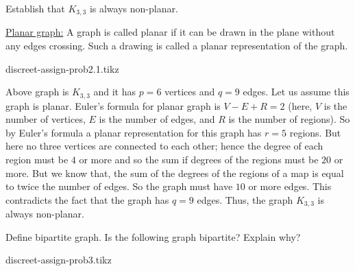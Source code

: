 \documentclass[12pt,class=article,crop=false]{standalone}
\begin{document}
\newpage
\begin{prob*}
    Establish that $ K_{3,3} $ is always non-planar.
\end{prob*}
\begin{soln}
    \underline{Planar graph:} A graph is called planar if it can be drawn in the plane without any edges crossing. Such a drawing is called a planar representation of the graph.\\

    \begin{center}
        {discreet-assign-prob2.1.tikz}
    \end{center}
    Above graph is $ K_{3,3} $ and it has $ p=6 $ vertices and $ q=9 $ edges. Let us assume this graph is planar. Euler's formula for planar graph is $ V-E+R=2 $ (here, $ V $ is the number of vertices, $ E $ is the number of edges, and $ R $ is the number of regions). So by Euler's formula a planar representation for this graph has $ r=5 $ regions. But here no three vertices are connected to each other; hence the degree of each region must be $ 4 $ or more and so the sum if degrees of the regions must be $ 20 $ or more. But we know that, the sum of the degrees of the regions of a map is equal to twice the number of edges. So the graph must have $ 10 $ or more edges. This contradicts the fact that the graph has $ q=9 $ edges. Thus, the graph $ K_{3,3} $ is always non-planar.
\end{soln}
\newpage
\begin{prob*}
    Define bipartite graph. Is the following graph bipartite? Explain why?
    \begin{center}
        {discreet-assign-prob3.tikz}
    \end{center}
\end{prob*}
\end{document}

